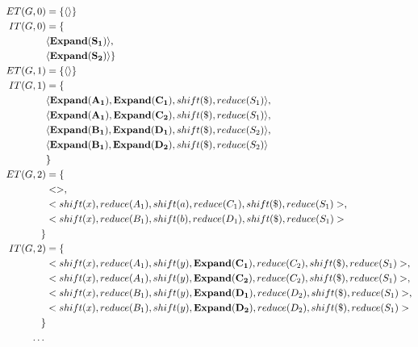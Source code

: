 \documentclass[a4paper,11pt]{article}
\begin{document}
{\small\begin{align*}
ET(G, 0) & = \{ \langle \rangle \}\\
IT(G, 0) & = \{\\
\quad & \langle \mathbf{Expand(S_1)} \rangle,\\
\quad & \langle \mathbf{Expand(S_2)} \rangle \}\\
ET(G, 1) & = \{ \langle \rangle \}\\
IT(G, 1) & = \{ \\
\quad & \langle \mathbf{Expand(A_1)}, \mathbf{Expand(C_1)}, shift(\$), reduce(S_1) \rangle,\\
\quad & \langle \mathbf{Expand(A_1)}, \mathbf{Expand(C_2)}, shift(\$), reduce(S_1) \rangle,\\
\quad & \langle \mathbf{Expand(B_1)}, \mathbf{Expand(D_1)}, shift(\$), reduce(S_2) \rangle, \\
\quad & \langle \mathbf{Expand(B_1)}, \mathbf{Expand(D_2)}, shift(\$), reduce(S_2) \rangle \\
\quad & \}\\
ET(G, 2) & = \{\\
\quad & <>, \\
\quad & <shift(x), reduce(A_1), shift(a), reduce(C_1), shift(\$), reduce(S_1)>,\\
\quad & <shift(x), reduce(B_1), shift(b), reduce(D_1), shift(\$), reduce(S_1)>\\
\}\\
IT(G, 2) & = \{ \\
\quad & <shift(x), reduce(A_1), shift(y), \mathbf{Expand(C_1)}, reduce(C_2), shift(\$), reduce(S_1)>,\\
\quad & <shift(x), reduce(A_1), shift(y), \mathbf{Expand(C_2)}, reduce(C_2), shift(\$), reduce(S_1)>,\\
\quad & <shift(x), reduce(B_1), shift(y), \mathbf{Expand(D_1)}, reduce(D_2), shift(\$), reduce(S_1)>,\\
\quad & <shift(x), reduce(B_1), shift(y), \mathbf{Expand(D_2)}, reduce(D_2), shift(\$), reduce(S_1)>\\
 \}\\
 \textellipsis
\end{align*}}


\end{document}
